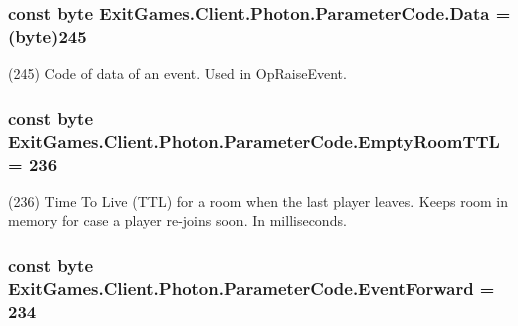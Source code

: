 \subsubsection[{\texorpdfstring{Data}{Data}}]{\setlength{\rightskip}{0pt plus 5cm}const byte Exit\+Games.\+Client.\+Photon.\+Parameter\+Code.\+Data = (byte)245}\hypertarget{class_exit_games_1_1_client_1_1_photon_1_1_parameter_code_af0ac326ecfd07601a765a21130f74d81}{}\label{class_exit_games_1_1_client_1_1_photon_1_1_parameter_code_af0ac326ecfd07601a765a21130f74d81}


(245) Code of data of an event. Used in Op\+Raise\+Event.

\subsubsection[{\texorpdfstring{Empty\+Room\+T\+TL}{EmptyRoomTTL}}]{\setlength{\rightskip}{0pt plus 5cm}const byte Exit\+Games.\+Client.\+Photon.\+Parameter\+Code.\+Empty\+Room\+T\+TL = 236}\hypertarget{class_exit_games_1_1_client_1_1_photon_1_1_parameter_code_a0574262c253d27175d80c8ca7771300d}{}\label{class_exit_games_1_1_client_1_1_photon_1_1_parameter_code_a0574262c253d27175d80c8ca7771300d}


(236) Time To Live (T\+TL) for a room when the last player leaves. Keeps room in memory for case a player re-\/joins soon. In milliseconds.

\subsubsection[{\texorpdfstring{Event\+Forward}{EventForward}}]{\setlength{\rightskip}{0pt plus 5cm}const byte Exit\+Games.\+Client.\+Photon.\+Parameter\+Code.\+Event\+Forward = 234}\hypertarget{class_exit_games_1_1_client_1_1_photon_1_1_parameter_code_a1b563d7ed2a72e96474490ee5b95a613}{}\label{class_exit_games_1_1_client_1_1_photon_1_1_parameter_code_a1b563d7ed2a72e96474490ee5b95a613}


